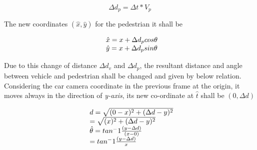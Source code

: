 \begin{equation}
\Delta d_p = \Delta t * V_p
\end{equation}

The new coordinates $(\hat{x}, \hat{y})$ for the pedestrian it shall be

\begin{equation}
\begin{array}{l@{}}
\hat{x} =x + \Delta d_p cos\theta \\
\hat{y} =x + \Delta d_p sin\theta
\end{array}			
\end{equation}

Due to this change of distance $\Delta d_v$ and $\Delta d_p$, the resultant distance and angle between vehicle and pedestrian shall be changed and given by below relation. Considering the car camera coordinate in the previous frame at the origin, it moves always in the direction of \textit{y-axis}, its new co-ordinate at $\hat{t}$ shall be $(0, \Delta d)$

\begin{equation}
\begin{array}{l@{}}
d =\sqrt{(0 - x)^2 + (\Delta d - y)^2} \\
	=\sqrt{(x)^2 + (\Delta d - y)^2} \\
\hat{\theta }= tan^-1\frac{(y-\Delta d)}{(x-0)} \\
			 = tan^-1\frac{(y-\Delta d)}{x} 
\end{array}			
\end{equation}


